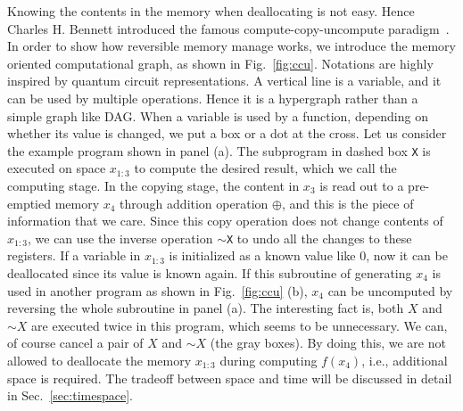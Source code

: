 \documentclass{article}
\newcommand{\<}{\langle}
\renewcommand{\>}{\rangle}
\newcommand{\Fig}[1]{Fig.~\ref{#1}}
\newcommand{\Sec}[1]{Sec.~\ref{#1}}
\theoremstyle{definition}\newtheorem{definition}{\textit{Definition}}
\begin{document}
Knowing the contents in the memory when deallocating is not easy. Hence Charles H. Bennett introduced the famous compute-copy-uncompute paradigm~\cite{Bennett1973}.
In order to show how reversible memory manage works, we introduce the memory oriented computational graph, as shown in \Fig{fig:ccu}.
Notations are highly inspired by quantum circuit representations. A vertical line is a variable, and it can be used by multiple operations. Hence it is a hypergraph rather than a simple graph like DAG. When a variable is used by a function, depending on whether its value is changed, we put a box or a dot at the cross.
Let us consider the example program shown in panel (a). The subprogram in dashed box \texttt{X} is executed on space $x_{1\colon3}$ to compute the desired result, which we call the computing stage. In the copying stage, the content in $x_3$ is read out to a pre-emptied memory $x_4$ through addition operation $\oplus$, and this is the piece of information that we care.
Since this copy operation does not change contents of $x_{1\colon3}$, we can use the inverse operation \texttt{$\sim$X} to undo all the changes to these registers. If a variable in $x_{1\colon3}$ is initialized as a known value like $0$, now it can be deallocated since its value is known again.
If this subroutine of generating $x_4$ is used in another program as shown in \Fig{fig:ccu} (b), $x_4$ can be uncomputed by reversing the whole subroutine in panel (a).
The interesting fact is, both $X$ and $\sim X$ are executed twice in this program, which seems to be unnecessary. We can, of course cancel a pair of $X$ and $\sim X$ (the gray boxes). By doing this, we are not allowed to deallocate the memory $x_{1\colon3}$ during computing $f(x_4)$, i.e., additional space is required. The tradeoff between space and time will be discussed in detail in \Sec{sec:timespace}.
\end{document}
